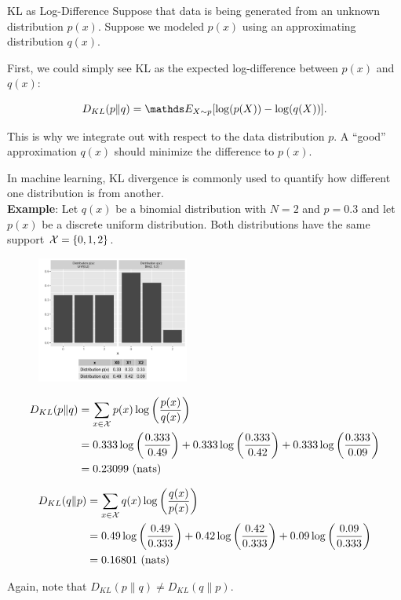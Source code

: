 \documentclass[11pt,compress,t,notes=noshow, xcolor=table]{beamer}
\begin{document}
\begin{vbframe} {KL as Log-Difference}
Suppose that data is being generated from an unknown distribution $p(x)$. 
Suppose we modeled $p(x)$ using an approximating distribution $q(x)$. 

\lz

First, we could simply see KL as the expected log-difference between $p(x)$ and $q(x)$:

  $$ D_{KL}(p \| q) = \E_{X \sim p}[\log(p(X)) - \log(q(X))].$$

This is why we integrate out with respect to the data distribution $p$.
A \enquote{good} approximation $q(x)$ should minimize the difference to $p(x)$.

\framebreak

In machine learning, KL divergence is commonly used to quantify how different one distribution is from another.\\
\lz
\textbf{Example}:
Let $q(x)$ be a binomial distribution with $N = 2$ and $p = 0.3$ and let $p(x)$ be a discrete uniform distribution. Both distributions have the same support $\mathcal{X} = \{0, 1, 2\}$.

\begin{figure}
\includegraphics[width = 5cm ]{figure/kl_log_diff_plot.png} 
\end{figure}

\framebreak

\begin{equation*}
  \begin{split}
 D_{KL}(p \| q) &= \sum_{x \in \mathcal{X}} p(x) \log \left( \frac{p(x)}{q(x)} \right)
 \\ &= 0.333 \log \left( \frac{0.333}{0.49} \right) + 0.333 \log \left( \frac{0.333}{0.42} \right) + 0.333 \log \left( \frac{0.333}{0.09} \right) \\ &= 0.23099 \text{    (nats)}
  \end{split}
\end{equation*}

\begin{equation*}
  \begin{split}
 D_{KL}(q \| p) &= \sum_{x \in \mathcal{X}} q(x) \log \left( \frac{q(x)}{p(x)} \right)
 \\ &= 0.49 \log \left( \frac{0.49}{0.333} \right) + 0.42 \log \left( \frac{0.42}{0.333} \right) + 0.09 \log \left( \frac{0.09}{0.333} \right) \\ &= 0.16801 \text{    (nats)}
  \end{split}
\end{equation*}

Again, note that $D_{KL}(p \| q) \neq D_{KL}(q \| p)$.
\end{vbframe}
\end{document}

